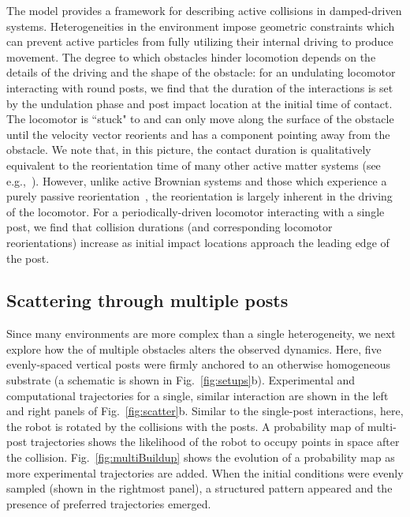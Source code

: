 \documentclass[aps,pre,twocolumn,superscriptaddress]{revtex4-1}
\begin{document}
The model provides a framework for describing active collisions in damped-driven systems. Heterogeneities in the environment impose geometric constraints which can prevent active particles from fully utilizing their internal driving to produce movement. The degree to which obstacles hinder locomotion depends on the details of the driving and the shape of the obstacle: for an undulating locomotor interacting with round posts, we find that the duration of the interactions is set by the undulation phase and post impact location at the initial time of contact. The locomotor is ``stuck" to and can only move along the surface of the obstacle until the velocity vector reorients and has a component pointing away from the obstacle. We note that, in this picture, the contact duration is qualitatively equivalent to the reorientation time of many other active matter systems (see e.g.,~\cite{bechinger2016active}).  However, unlike active Brownian systems and those which experience a purely passive reorientation~\cite{Li2017mm}, the reorientation is largely inherent in the driving of the locomotor. For a periodically-driven locomotor interacting with a single post, we find that collision durations (and corresponding locomotor reorientations) increase as initial impact locations approach the leading edge of the post.   

\subsection{Scattering through multiple posts}\label{sec:interactions_multi}

Since many environments are more complex than a single heterogeneity, we next explore how the of multiple obstacles alters the observed dynamics. Here, five evenly-spaced vertical posts were firmly anchored to an otherwise homogeneous substrate (a schematic is shown in Fig.~\ref{fig:setups}b). Experimental and computational trajectories for a single, similar interaction are shown in the left and right panels of Fig.~\ref{fig:scatter}b. Similar to the single-post interactions, here, the robot is rotated by the collisions with the posts. A probability map of multi-post trajectories shows the likelihood of the robot to occupy points in space after the collision. Fig.~\ref{fig:multiBuildup} shows the evolution of a probability map as more experimental trajectories are added.  When the initial conditions were evenly sampled (shown in the rightmost panel), a structured pattern appeared and the presence of preferred trajectories emerged. 
\end{document}
